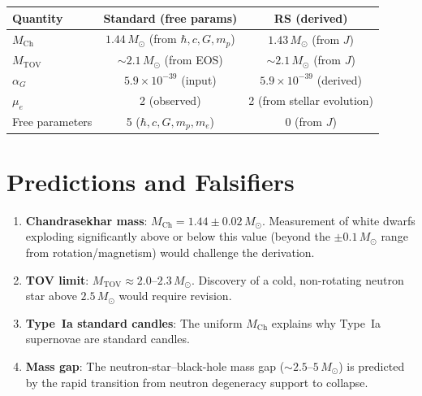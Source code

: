 \documentclass[12pt,a4paper]{article}
\theoremstyle{definition}
\theoremstyle{remark}
\begin{document}
\begin{center}
\renewcommand{\arraystretch}{1.3}
\begin{tabular}{@{}lcc@{}}
\toprule
\textbf{Quantity} & \textbf{Standard (free params)} &
\textbf{RS (derived)} \\
\midrule
$M_{\mathrm{Ch}}$ & $1.44\,M_\odot$ (from $\hbar,c,G,m_p$) &
$1.43\,M_\odot$ (from $J$) \\
$M_{\mathrm{TOV}}$ & $\sim 2.1\,M_\odot$ (from EOS) &
$\sim 2.1\,M_\odot$ (from $J$) \\
$\alpha_G$ & $5.9 \times 10^{-39}$ (input) &
$5.9 \times 10^{-39}$ (derived) \\
$\mu_e$ & 2 (observed) & 2 (from stellar evolution) \\
Free parameters & 5 ($\hbar,c,G,m_p,m_e$) & 0 (from $J$) \\
\bottomrule
\end{tabular}
\end{center}

\section{Predictions and Falsifiers}
\label{sec:predictions}

\begin{enumerate}
  \item \textbf{Chandrasekhar mass}:
  $M_{\mathrm{Ch}} = 1.44 \pm 0.02\,M_\odot$.  Measurement of
  white dwarfs exploding significantly above or below this value
  (beyond the $\pm 0.1\,M_\odot$ range from rotation/magnetism)
  would challenge the derivation.

  \item \textbf{TOV limit}: $M_{\mathrm{TOV}} \approx 2.0$--$2.3\,
  M_\odot$.  Discovery of a cold, non-rotating neutron star above
  $2.5\,M_\odot$ would require revision.

  \item \textbf{Type~Ia standard candles}: The uniform
  $M_{\mathrm{Ch}}$ explains why Type~Ia supernovae are standard
  candles.

  \item \textbf{Mass gap}: The neutron-star--black-hole mass gap
  ($\sim 2.5$--$5\,M_\odot$) is predicted by the rapid transition
  from neutron degeneracy support to collapse.
\end{enumerate}
\end{document}
